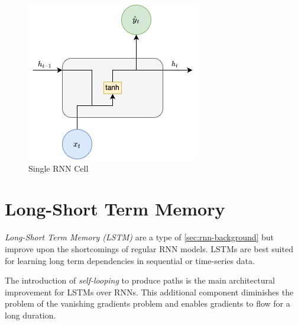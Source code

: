         \begin{figure}[h!]
            \centering
            \includegraphics[scale=0.5]{figures/single_rnn_cell.drawio.png}
            \caption{Single RNN Cell}
            \label{fig:single-rnn-cell}
        \end{figure}

    \section{Long-Short Term Memory}
    \label{sec:lstm-background}

        \emph{Long-Short Term Memory (LSTM)} are a type of \ref{sec:rnn-background} but improve upon the shortcomings of regular RNN models.
        LSTMs are best suited for learning long term dependencies in sequential or time-series data.

        The introduction of \emph{self-looping} to produce paths is the main architectural improvement for LSTMs over RNNs. This additional component diminishes the problem of the vanishing gradients problem and enables gradients to flow for a long duration.